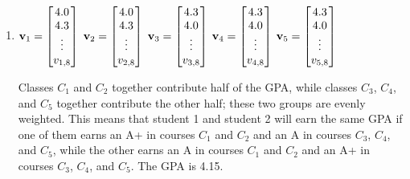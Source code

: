 \begin{solution}
\begin{enumerate}
  \item 
  	\begin{answer}
	$\mathbf{v}_1 = \begin{bmatrix}4.0 \\ 4.3 \\ \vdots \\ v_{1,8}\end{bmatrix}$
	$\mathbf{v}_2 = \begin{bmatrix}4.0 \\ 4.3\\ \vdots \\ v_{2,8}\end{bmatrix}$
	$\mathbf{v}_3 = \begin{bmatrix}4.3 \\ 4.0\\ \vdots \\ v_{3,8}\end{bmatrix}$
	$\mathbf{v}_4 = \begin{bmatrix}4.3 \\ 4.0\\ \vdots \\ v_{4,8}\end{bmatrix}$
	$\mathbf{v}_5 = \begin{bmatrix}4.3 \\ 4.0\\ \vdots \\ v_{5,8}\end{bmatrix}$
	\end{answer}
	Classes $C_1$ and $C_2$ together contribute half of the GPA, while classes $C_3$, $C_4$, and $C_5$ together contribute the other half; these two groups are evenly weighted. This means that student 1 and student 2 will earn the same GPA if one of them earns an A+ in courses $C_1$ and $C_2$ and an A in courses $C_3$, $C_4$, and $C_5$, while the other earns an A in courses $C_1$ and $C_2$ and an A+ in courses $C_3$, $C_4$, and $C_5$. The GPA is 4.15.
	
	
	\end{enumerate}
\end{solution}

